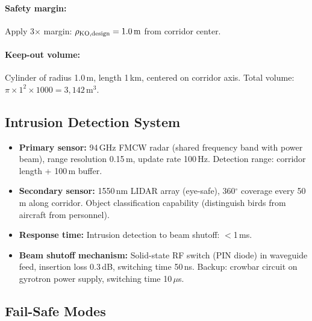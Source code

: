 \documentclass[11pt,a4paper]{article}
\begin{document}
\paragraph{Safety margin:} Apply 3$\times$ margin:
$\rho_{\rm KO,design} = 1.0\,\text{m}$ from corridor center.

\paragraph{Keep-out volume:} Cylinder of radius 1.0\,m, length 1\,km,
centered on corridor axis. Total volume: $\pi \times 1^2 \times 1000
= 3{,}142\,\text{m}^3$.

\subsection{Intrusion Detection System}

\begin{itemize}
\item \textbf{Primary sensor:} 94\,GHz FMCW radar (shared frequency band
with power beam), range resolution 0.15\,m, update rate 100\,Hz.
Detection range: corridor length + 100\,m buffer.

\item \textbf{Secondary sensor:} 1550\,nm LIDAR array (eye-safe), 360$^\circ$
coverage every 50\,m along corridor. Object classification capability
(distinguish birds from aircraft from personnel).

\item \textbf{Response time:} Intrusion detection to beam shutoff: $<$1\,ms.

\item \textbf{Beam shutoff mechanism:} Solid-state RF switch (PIN diode) in
waveguide feed, insertion loss 0.3\,dB, switching time 50\,ns.
Backup: crowbar circuit on gyrotron power supply, switching time 10\,$\mu$s.
\end{itemize}

\subsection{Fail-Safe Modes}
\end{document}
